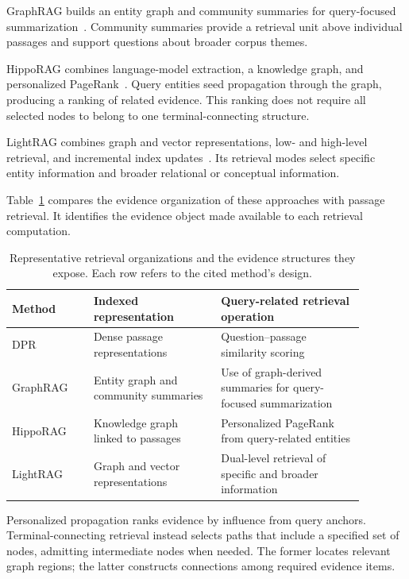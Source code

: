 GraphRAG builds an entity graph and community summaries for query-focused summarization~\cite{bg-graphrag}. Community summaries provide a retrieval unit above individual passages and support questions about broader corpus themes.

HippoRAG combines language-model extraction, a knowledge graph, and personalized PageRank~\cite{bg-hipporag}. Query entities seed propagation through the graph, producing a ranking of related evidence. This ranking does not require all selected nodes to belong to one terminal-connecting structure.

LightRAG combines graph and vector representations, low- and high-level retrieval, and incremental index updates~\cite{bg-lightrag}. Its retrieval modes select specific entity information and broader relational or conceptual information.

Table~\ref{tab:background:retrieval-units} compares the evidence organization of these approaches with passage retrieval. It identifies the evidence object made available to each retrieval computation.

\begin{table}[tbp]
\centering
\caption{Representative retrieval organizations and the evidence structures they expose. Each row refers to the cited method's design.}
\label{tab:background:retrieval-units}
\small
\begin{tabular}{p{0.20\linewidth}p{0.32\linewidth}p{0.36\linewidth}}
\toprule
Method&Indexed representation&Query-related retrieval operation\\
\midrule
DPR~\cite{bg-dpr}&Dense passage representations&Question--passage similarity scoring\\
GraphRAG~\cite{bg-graphrag}&Entity graph and community summaries&Use of graph-derived summaries for query-focused summarization\\
HippoRAG~\cite{bg-hipporag}&Knowledge graph linked to passages&Personalized PageRank from query-related entities\\
LightRAG~\cite{bg-lightrag}&Graph and vector representations&Dual-level retrieval of specific and broader information\\
\bottomrule
\end{tabular}
\end{table}

Personalized propagation ranks evidence by influence from query anchors. Terminal-connecting retrieval instead selects paths that include a specified set of nodes, admitting intermediate nodes when needed. The former locates relevant graph regions; the latter constructs connections among required evidence items.

